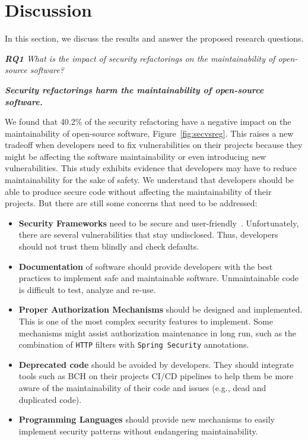 \documentclass[10pt,conference]{IEEEtran}
\begin{document}
{\section{Discussion}\label{sec:discussion}

In this section, we discuss the results and answer the proposed research questions.

\begin{framed}
\textit{\textbf{RQ1} What is the impact of security refactorings on the maintainability
of open-source software?}
\end{framed}

\textbf{\textit{Security refactorings harm the maintainability of open-source software.}}

We found that 40.2\% of the security refactoring have a negative impact on the
maintainability of open-source software, Figure~\ref{fig:secvsreg}. This raises
a new tradeoff when developers need to fix vulnerabilities on their projects
because they might be affecting the software maintainability or even introducing
new vulnerabilities. This study exhibits evidence that developers may have to
reduce maintainability for the sake of safety. We understand that developers
should be able to produce secure code without affecting the maintainability of
their projects. But there are still some concerns that need to be addressed:
\begin{itemize}
	\item \textbf{Security Frameworks} need to be secure and user-friendly~\cite{5287006, 7676144}. Unfortunately,
	there are several vulnerabilities that stay undisclosed. Thus, developers should not
	trust them blindly and check defaults.
	\item \textbf{Documentation} of software should provide developers with the best practices to implement safe and maintainable software. Unmaintainable code is difficult to test, analyze and re-use.
	\item \textbf{Proper Authorization Mechanisms} should be designed and implemented. This is
	one of the most complex security features to implement. Some mechanisms might assist authorization maintenance in long run, such as the combination of \texttt{HTTP} filters with \texttt{Spring Security} annotations.
	\item \textbf{Deprecated code} should be avoided by developers. They should integrate tools such as BCH on their projects CI/CD pipelines to help them be more aware of the maintainability of their code and issues (e.g., dead and duplicated code).
	\item\textbf{Programming Languages} should provide new mechanisms to easily implement security patterns without endangering maintainability.


\end{itemize}}
\end{document}
